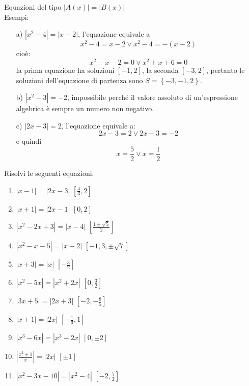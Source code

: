 Equazioni del tipo $|A(x)|=|B(x)|$\\
Esempi:
\begin{enumerate}
        \item[a)] $|x^2-4|=|x-2|$, l'equazione equivale a
        $$x^2-4=x-2 \vee x^2-4=-(x-2)$$
        cioè:
        $$x^2-x-2=0 \vee x^2+x+6=0$$la prima equazione ha soluzioni $[-1, 2]$, 
la seconda $[-3, 2]$, pertanto le soluzioni dell'equazione di partenza sono 
$S=\left\lbrace -3, -1, 2\right\rbrace $.
        
        \item[b)] $|x^2-3|=-2$, impossibile perché il valore assoluto di 
un'espressione algebrica è sempre un numero non negativo.
        \item[c)] $|2x-3|=2$, l'equazione equivale a:
        $$2x-3=2 \vee 2x-3=-2$$
        e quindi
        $$x=\frac{5}{2}\vee x=\frac{1}{2}$$
\end{enumerate}

Risolvi le seguenti equazioni:

\begin{enumerate}
\item $\left| x-1\right| =\left| 2x-3\right| $ \hfill $\left[ \frac{4}{3}, 
2\right] $
\item $\left| x+1\right| =\left| 2x-1\right| $ \hfill $\left[ 0, 2\right] $
\item $\left| x^2-2x+3 \right| =\left| x-4 \right| $ \hfill $\left[ 
\frac{1\pm\sqrt{5}}{2}\right] $
\item $\left| x^2-x-5\right| =\left| x-2\right| $ \hfill $\left[ -1, 3, \pm 
\sqrt{7}\right] $
\item $\left| x+3\right| =\left| x\right| $ \hfill $\left[ -\frac{3}{2} \right] 
$
\item $\left| x^2-5x \right| =\left| x^2+2x \right| $ \hfill $\left[ 0, 
\frac{3}{2} \right] $
\item $\left| 3x+5\right| =\left| 2x+3\right| $ \hfill $\left[-2, -\frac{8}{5} 
\right] $
\item $\left| x+1\right| =\left| 2x\right| $ \hfill $\left[ -\frac{1}{3}, 1 
\right] $
\item $\left| x^3-6x\right| =\left| x^3-2x\right| $ \hfill $\left[ 0, \pm 2 
\right] $
\item $\left|\frac{x^2+1}{x}\right| =\left| 2x\right| $ \hfill $\left[ \pm 1 
\right] $
\item $\left| x^2-3x-10\right| =\left| x^2-4\right| $ \hfill $\left[-2, 
\frac{7}{2} \right] $
\end{enumerate}

